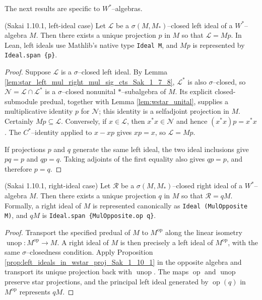The next results are specific to $W^{*}$--algebras.

\begin{proposition}
  \label{prop:left_ideals_in_wstar_proj_Sak_1_10_1} (Sakai 1.10.1, left-ideal case)
  \leanok
  Let $\mathcal{L}$ be a $\sigma(M,M_{*})$--closed left ideal of a $W^{*}$--algebra $M$.
  Then there exists a unique projection $p$ in $M$ so that $\mathcal{L}=Mp$.
  In Lean, left ideals use Mathlib's native type \texttt{Ideal M}, and $Mp$ is represented by
  \texttt{Ideal.span \{p\}}.
\end{proposition}

\begin{proof}
  \leanok
  Suppose $\mathcal{L}$ is a $\sigma$--closed left ideal. By Lemma \ref{lem:star_left_mul_right_mul_sig_cts_Sak_1_7_8}, $\mathcal{L^{*}}$ is
  also $\sigma$--closed, so $\mathcal{N}=\mathcal{L}\cap \mathcal{L}^{*}$ is a $\sigma$--closed
  nonunital $*$--subalgebra of $M$. Its explicit closed-submodule predual, together with Lemma
  \ref{lem:wstar_unital}, supplies a multiplicative identity $p$ for $\mathcal{N}$; this identity is
  a selfadjoint projection in $M$. Certainly $Mp\subseteq\mathcal{L}$. Conversely, if
  $x\in\mathcal{L}$, then $x^{*}x\in\mathcal{N}$ and hence $(x^{*}x)p=x^{*}x$. The $C^{*}$--identity
  applied to $x-xp$ gives $xp=x$, so $\mathcal{L}=Mp$.

  If projections $p$ and $q$ generate the same left ideal, the two ideal inclusions give
  $pq=p$ and $qp=q$. Taking adjoints of the first equality also gives $qp=p$, and therefore
  $p=q$.
\end{proof}

\begin{corollary}
  \label{cor:right_ideals_in_wstar_proj_Sak_1_10_1} (Sakai 1.10.1, right-ideal case)
  \leanok
  Let $\mathcal{R}$ be a $\sigma(M,M_{*})$--closed right ideal of a $W^{*}$--algebra $M$.
  Then there exists a unique projection $q$ in $M$ so that $\mathcal{R}=qM$.
  Formally, a right ideal of $M$ is represented canonically as
  \texttt{Ideal (MulOpposite M)},
  and $qM$ is \texttt{Ideal.span \{MulOpposite.op q\}}.
\end{corollary}

\begin{proof}
  \leanok
  Transport the specified predual of $M$ to $M^{\mathrm{op}}$ along the linear isometry
  $\operatorname{unop}:M^{\mathrm{op}}\to M$. A right ideal of $M$ is then precisely a left ideal
  of $M^{\mathrm{op}}$, with the same $\sigma$--closedness condition. Apply Proposition
  \ref{prop:left_ideals_in_wstar_proj_Sak_1_10_1} in the opposite algebra and transport its unique
  projection back with $\operatorname{unop}$. The maps $\operatorname{op}$ and
  $\operatorname{unop}$ preserve star projections, and the principal left ideal generated by
  $\operatorname{op}(q)$ in $M^{\mathrm{op}}$ represents $qM$.
\end{proof}


